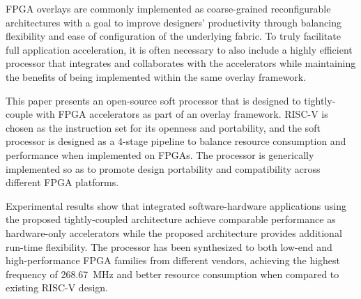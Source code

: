FPGA overlays are commonly implemented as coarse-grained reconfigurable architectures with a goal to improve designers' productivity through balancing flexibility and ease of configuration of the underlying fabric.  To truly facilitate full application acceleration, it is often necessary to also include a highly efficient processor that integrates and collaborates with the accelerators while maintaining the benefits of being implemented within the same overlay framework.

This paper presents an open-source soft processor that is designed to tightly-couple with FPGA accelerators as part of an overlay framework. RISC-V is chosen as the instruction set for its openness and portability, and the soft processor is designed as a 4-stage pipeline to balance resource consumption and performance when implemented on FPGAs. The processor is generically implemented so as to promote design portability and compatibility across different FPGA platforms.

Experimental results show that integrated software-hardware applications using the proposed tightly-coupled architecture achieve comparable performance as hardware-only accelerators while the proposed architecture provides additional run-time flexibility.  The processor has been synthesized to both low-end and high-performance FPGA families from different vendors, achieving the highest frequency of \SI{268.67}{\mega\hertz} and better resource consumption when compared to existing RISC-V design.
